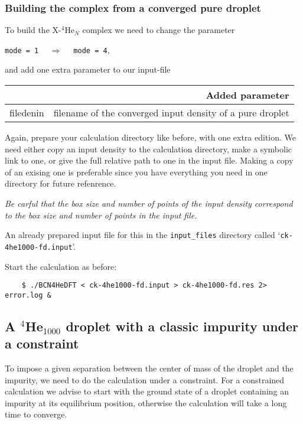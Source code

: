 \documentclass[10pt,a4paper]{article}
\begin{document}
	\subsubsection{Building the complex from a converged pure droplet}
	To build the X-$^4$He$_N$ complex we need to change the parameter
	\begin{center}
	\verb|mode = 1|	$\quad\Longrightarrow\quad$	\verb|mode = 4|,
	\end{center}
	and add one extra parameter to our input-file
	\begin{center}
	\begin{tabular}{l|p{9.75cm}}
		\multicolumn{2}{r}{\textbf{Added parameter}} \\
		\hline\hline
		filedenin 			& filename of the converged input density of a pure droplet \\
	\end{tabular}
	\end{center}
	\vspace{0.1cm}
	Again, prepare your calculation directory like before, with one extra edition. We need either copy an input density to the calculation directory, make a symbolic link to one, or give the full relative path to one in the input file. Making a copy of an exising one is preferable since you have everything you need in one directory for future refenrence.
	
	\emph{Be carful that the box size and number of points of the input density correspond to the box size and number of points in the input file.}
	
	An already prepared input file for this in the \verb|input_files| directory called `\verb|ck-4he1000-fd.input|'.
	
	Start the calculation as before:
	\begin{verbatim}
	$ ./BCN4HeDFT < ck-4he1000-fd.input > ck-4he1000-fd.res 2> error.log &
	\end{verbatim}	

	\subsection{A $^4$He$_{1000}$ droplet with a classic impurity under a constraint}\label{sec:ck-constr}
	
	To impose a given separation between the center of mass of the droplet and the impurity, we need to do the calculation under a constraint. For a constrained calculation we advise to start with the ground state of a droplet containing an impurity at its equilibrium position, otherwise the calculation will take a long time to converge.
	
\end{document}
